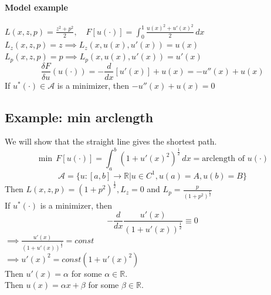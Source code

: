 \documentclass[11pt]{article}
\newcommand{\mc}[1]{\mathcal{#1}}
\newcommand{\real}[0]{\mathbb{R}}
\begin{document}
\paragraph{Model example}
$L(x, z, p) = \frac{z^2 + p^2}{2}, \quad F[u(\cdot)] = \int_0^1 \frac{u(x)^2 + u'(x)^2}{2} \, dx$\\
$L_z(x,z,p) = z \implies L_z(x,u(x),u'(x)) = u(x)$ \\
$L_p(x,z,p) = p \implies L_p(x,u(x),u'(x)) = u'(x)$ \\
$$\frac{\delta F}{\delta u}(u(\cdot)) = -\frac{d}{dx}[u'(x)] + u(x) = -u''(x) + u(x)$$
If $u^*(\cdot) \in \mc{A}$ is a minimizer, then
$-u''(x) + u(x) = 0$
\subsection{Example: min arclength}
We will show that the straight line gives the shortest path.\\
$$\min \, F[u(\cdot)] = \int_a^b(1+u'(x)^2)^\frac{1}{2}\,dx = \text{arclength of $u(\cdot)$}$$
$$\mc{A} = \{ u: [a,b] \rightarrow \real | u \in C^1, u(a) = A, u(b) = B\}$$
Then $L(x,z,p) = (1+p^2)^{\frac{1}{2}}, L_z = 0$ and $L_p = \frac{p}{(1+p^2)^\frac{1}{2}}$ \\
If $u^*(\cdot)$ is a minimizer, then
$$- \frac{d}{dx}\frac{u'(x)}{(1+u'(x))^\frac{1}{2}} \equiv 0$$
$\implies \frac{u'(x)}{(1+u'(x))^\frac{1}{2}} = const$ \\
$\implies u'(x)^2 = const(1 + u'(x)^2)$ \\
Then $u'(x) = \alpha$ for some $\alpha \in \real$. \\
Then $u(x) = \alpha x + \beta $ for some $\beta \in \real$.
\end{document}
